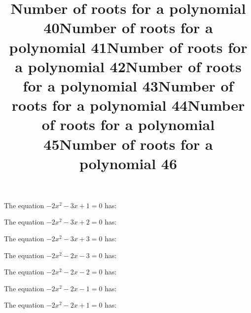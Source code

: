 \documentclass{article}
\begin{document}
\begin{category}
\begin{question}[multichoice]
\end{question}
\begin{question}[multichoice]
\title{Number of roots for a polynomial 40}
The equation $- 2 x^{2} - 3 x + 1=0$ has:



\end{question}
\begin{question}[multichoice]
\title{Number of roots for a polynomial 41}
The equation $- 2 x^{2} - 3 x + 2=0$ has:



\end{question}
\begin{question}[multichoice]
\title{Number of roots for a polynomial 42}
The equation $- 2 x^{2} - 3 x + 3=0$ has:



\end{question}
\begin{question}[multichoice]
\title{Number of roots for a polynomial 43}
The equation $- 2 x^{2} - 2 x - 3=0$ has:



\end{question}
\begin{question}[multichoice]
\title{Number of roots for a polynomial 44}
The equation $- 2 x^{2} - 2 x - 2=0$ has:



\end{question}
\begin{question}[multichoice]
\title{Number of roots for a polynomial 45}
The equation $- 2 x^{2} - 2 x - 1=0$ has:



\end{question}
\begin{question}[multichoice]
\title{Number of roots for a polynomial 46}
The equation $- 2 x^{2} - 2 x + 1=0$ has:


\end{question}
\end{category}
\end{document}
